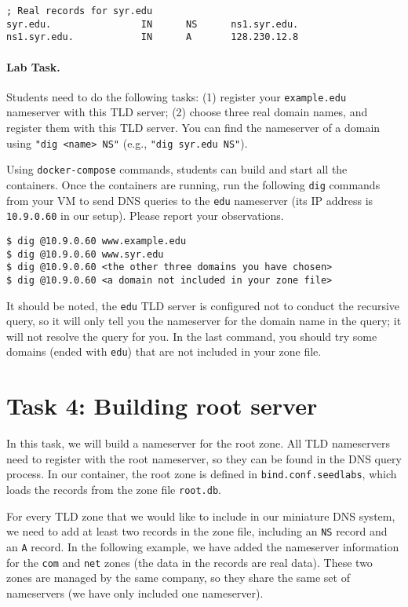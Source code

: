 \begin{lstlisting}
; Real records for syr.edu
syr.edu.                IN      NS      ns1.syr.edu.
ns1.syr.edu.            IN      A       128.230.12.8
\end{lstlisting}
 

\paragraph{Lab Task.}
Students need to do the following tasks: (1) register 
your \texttt{example.edu} nameserver with this TLD server;
(2) choose three real domain names, and register them
with this TLD server. You can find the nameserver of a domain
using \texttt{"dig <name> NS"} (e.g., \texttt{"dig syr.edu NS"}). 


Using \texttt{docker-compose} commands, students can 
build and start all the containers. 
Once the containers are running,
run the following \texttt{dig} commands from your VM to
send DNS queries to the \texttt{edu} nameserver (its IP address
is \texttt{10.9.0.60} in our setup). 
Please report your observations. 


\begin{lstlisting}
$ dig @10.9.0.60 www.example.edu
$ dig @10.9.0.60 www.syr.edu
$ dig @10.9.0.60 <the other three domains you have chosen>
$ dig @10.9.0.60 <a domain not included in your zone file>
\end{lstlisting}

It should be noted, the \texttt{edu} TLD server is configured 
not to conduct the recursive query, so it will only tell you
the nameserver for the domain name in the query; it will not
resolve the query for you. In the last command, you should
try some domains (ended with \texttt{edu}) that are not included in your zone file. 


\section{Task 4: Building root server}


In this task, we will build a nameserver for the 
root zone. All TLD nameservers need to register
with the root nameserver, so they can be found
in the DNS query process. 
In our container, the root zone is defined in 
\texttt{bind.conf.seedlabs}, which loads the records 
from the zone file \texttt{root.db}. 


For every TLD zone that we would like to include in our 
miniature DNS system, we need to add at least two records
in the zone file, including an \texttt{NS} record 
and an \texttt{A} record.  In the following example,
we have added the nameserver information for the 
\texttt{com} and \texttt{net} zones (the data in the records are real data).
These two zones are managed by the same company, so they share the 
same set of nameservers (we have only included one nameserver).

